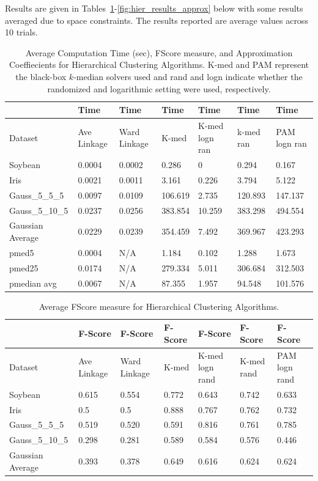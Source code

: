 \documentclass[conference, 10pt, final]{IEEEtran}
\begin{document}
Results are given in Tables~\ref{fig:hier_results_comp}-\ref{fig:hier_results_approx}  below with some results averaged due to space constraints. The results reported are average values across 10 trials.

\begin{table}[!t]
\label{fig:hier_results_comp}
\caption{Average Computation Time (sec), FScore measure, and Approximation Coeffiecients for Hierarchical Clustering Algorithms. K-med and PAM represent the black-box $k$-median solvers used and rand and logn indicate whether the randomized and logarithmic setting were used, respectively.}
\centering
\begin{tabular}{ | l | l | l | l | l | l | l | }
\hline
	   & Time & Time & Time & Time & Time & Time \\ \hline
	Dataset & Ave Linkage & Ward Linkage & K-med & K-med logn ran & k-med ran & PAM logn ran \\ \hline
	Soybean & 0.0004 & 0.0002 & 0.286 & 0 & 0.294 & 0.167 \\ 
	Iris & 0.0021 & 0.0011 & 3.161 & 0.226 & 3.794 & 5.122 \\ 
	Gauss\_5\_5\_5 & 0.0097 & 0.0109 & 106.619 & 2.735 &120.893 & 147.137 \\
	Gauss\_5\_10\_5 & 0.0237 & 0.0256 & 383.854 & 10.259 & 383.298 & 494.554 \\
	Gaussian Average & 0.0229 & 0.0239 & 354.459 & 7.492 & 369.967 & 423.293 \\ 
	pmed5 &  0.0004 & N/A & 1.184 & 0.102 & 1.288 & 1.673   \\ 
	pmed25 & 0.0174 & N/A & 279.334 & 5.011 & 306.684 & 312.503   \\ 
	pmedian avg & 0.0067 & N/A &  87.355 & 1.957 & 94.548 & 101.576   \\ \hline
\end{tabular}
\end{table}

\begin{table}[!t]
\label{fig:hier_results_FScore}
\caption{Average FScore measure for Hierarchical Clustering Algorithms.}
\centering
\begin{tabular}{ | l | l | l | l | l | l | l | }
\hline
	   & F-Score & F-Score & F-Score & F-Score & F-Score & F-Score \\ \hline
	Dataset & Ave Linkage & Ward Linkage & K-med & K-med logn rand & K-med rand & PAM logn rand \\ \hline
	Soybean & 0.615 & 0.554 & 0.772 & 0.643 & 0.742 & 0.633 \\ 
	Iris & 0.5 & 0.5 & 0.888 & 0.767 & 0.762 & 0.732 \\ 
	Gauss\_5\_5\_5 & 0.519 & 0.520 & 0.591 & 0.816 & 0.761 & 0.785 \\
	Gauss\_5\_10\_5 & 0.298 & 0.281 & 0.589 & 0.584 & 0.576 & 0.446 \\
	Gaussian Average & 0.393 & 0.378 & 0.649 & 0.616 & 0.624 & 0.624 \\ \hline
\end{tabular}
\end{table}
\end{document}
